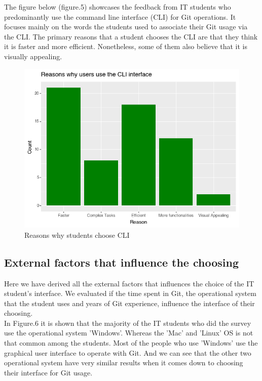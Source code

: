 \documentclass[]{report}
\begin{document}
	The figure below (figure.5) showcases the feedback from IT students who predominantly use the command line interface (CLI) for Git operations. It focuses mainly on the words the students used to associate their Git usage via the CLI. The primary reasons that a student chooses the CLI are that they think it is faster and more efficient. Nonetheless, some of them also believe that it is visually appealing.
	
	\begin{figure}[H]
		\centering
		\includegraphics[width=0.75\linewidth]{ReasonsCLI}
		\caption{Reasons why students choose CLI}
		\label{fig: 5}
	\end{figure}

	\subsection{External factors that influence the choosing }
	Here we have derived all the external factors that influences the choice of the IT student's interface.  We evaluated if the time spent in Git, the operational system that the student uses and years of Git experience, influence the interface of their choosing.\\
	
	In Figure.6 it is shown that the majority of the IT students who did the survey use the operational system 'Windows'. Whereas the 'Mac' and 'Linux' OS is not that common among the students. Most of the people who use 'Windows' use the graphical user interface to operate with Git. And we can see that the other two operational system have very similar results when it comes down to choosing their interface for Git usage.
	
\end{document}
